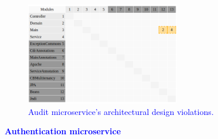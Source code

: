 \documentclass[12pt]{article}
\begin{document}
\begin{figure}[ht]
\centering
\includegraphics[width=0.6\textwidth]{figuras/violacoesAudit.png}
\caption{\textcolor{blue}{Audit microservice's architectural design violations.}}
\label{fig:microservices}
\end{figure}
\newpage
\noindent\textbf{\textcolor{blue}{Authentication microservice}}
\label{sec:ApendiceAuthentication}
\end{document}
